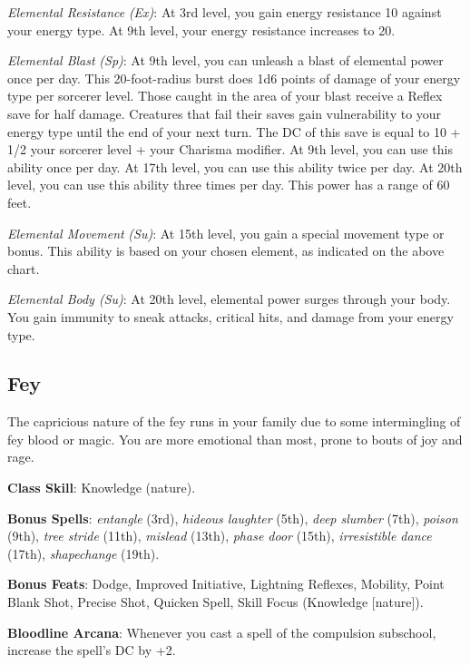 \textit{Elemental Resistance} \textit{(Ex)}: At 3rd level, you gain energy resistance 10 against your energy type. At 9th level, your energy resistance increases to 20.
				
\textit{Elemental Blast} \textit{(Sp)}: At 9th level, you can unleash a blast of elemental power once per day. This 20-foot-radius burst does 1d6 points of damage of your energy type per sorcerer level. Those caught in the area of your blast receive a Reflex save for half damage. Creatures that fail their saves gain vulnerability to your energy type until the end of your next turn. The DC of this save is equal to 10 + 1/2 your sorcerer level + your Charisma modifier. At 9th level, you can use this ability once per day. At 17th level, you can use this ability twice per day. At 20th level, you can use this ability three times per day. This power has a range of 60 feet.
				
\textit{Elemental Movement} \textit{(Su)}: At 15th level, you gain a special movement type or bonus. This ability is based on your chosen element, as indicated on the above chart.
				
\textit{Elemental Body (Su)}: At 20th level, elemental power surges through your body. You gain immunity to sneak attacks, critical hits, and damage from your energy type.
				
\subsection{Fey}

				
The capricious nature of the fey runs in your family due to some intermingling of fey blood or magic. You are more emotional than most, prone to bouts of joy and rage.
				
\textbf{Class Skill}: Knowledge (nature).
				
\textbf{Bonus Spells}: \textit{entangle }(3rd), \textit{hideous laughter} (5th), \textit{deep slumber} (7th), \textit{poison} (9th), \textit{tree stride} (11th), \textit{mislead} (13th), \textit{phase door} (15th), \textit{irresistible dance} (17th), \textit{shapechange }(19th).
				
\textbf{Bonus Feats}: Dodge, Improved Initiative, Lightning Reflexes, Mobility, Point Blank Shot, Precise Shot, Quicken Spell, Skill Focus (Knowledge \mbox{$[$}nature\mbox{$]$}).
				
\textbf{Bloodline Arcana}: Whenever you cast a spell of the compulsion subschool, increase the spell's DC by +2.
				
